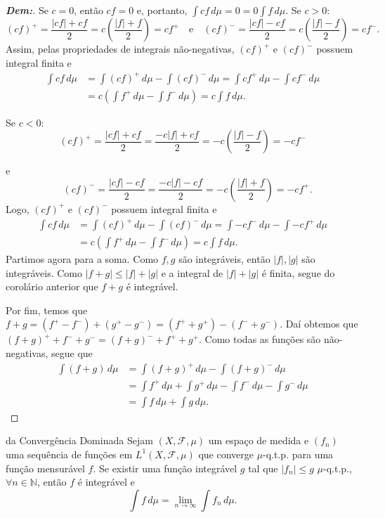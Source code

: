 \begin{proof}[\textbf{Dem:}]
Se $c = 0$, então $cf = 0$ e, portanto, $\int cf \, d\mu = 0 = 0 \int f \, d\mu$.
Se $c > 0$:
$$ (cf)^+ = \frac{|cf| + cf}{2} = c \left( \frac{|f| + f}{2} \right) = c f^+ \quad \text{e} \quad (cf)^- = \frac{|cf| - cf}{2} = c \left( \frac{|f| - f}{2} \right) = c f^-. $$
Assim, pelas propriedades de integrais não-negativas, $(cf)^+$ e $(cf)^-$ possuem integral finita e
\begin{align*}
  \int cf \, d\mu &= \int (cf)^+ \, d\mu - \int (cf)^- \, d\mu 
  = \int c f^+ \, d\mu - \int c f^- \, d\mu \\
  &= c \left( \int f^+ \, d\mu - \int f^- \, d\mu \right) = c \int f \, d\mu. 
\end{align*}

\noindent
Se $c < 0$:
$$ (cf)^+ = \frac{|cf| + cf}{2} = \frac{-c|f| + cf}{2} = -c \left( \frac{|f| - f}{2} \right) = -c f^-$$ 

\noindent
e
  $$\quad (cf)^- = \frac{|cf| - cf}{2} = \frac{-c|f| - cf}{2} = -c \left( \frac{|f| + f}{2} \right) = -c f^+. $$
Logo, $(cf)^+$ e $(cf)^-$ possuem integral finita e
\begin{align*}
  \int cf \, d\mu &= \int (cf)^+ \, d\mu - \int (cf)^- \, d\mu 
  = \int -cf^- \, d\mu - \int -cf^+ \, d\mu\\
  &= c \left( \int f^+ \, d\mu - \int f^- \, d\mu \right) = c \int f \, d\mu.  
\end{align*} 
Partimos agora para a soma. Como $f, g$ são integráveis, então $|f|, |g|$ são integráveis. Como $|f+g| \le |f| + |g|$ e a integral de $|f| + |g|$ é finita, segue do corolário anterior que $f+g$ é integrável.

Por fim, temos que $f+g = (f^+ - f^-) + (g^+ - g^-) = (f^+ + g^+) - (f^- + g^-)$. 
  Daí obtemos que $(f+g)^+ + f^- + g^- = (f+g)^- + f^+ + g^+$.
  Como todas as funções são não-negativas, segue que  
\begin{align*}
  \int (f+g) \, d\mu &=  \int (f+g)^+ \, d\mu - \int (f+g)^- \, d\mu\\
    &= \int f^+ \, d\mu  + \int g^+ \, d\mu - \int f^- \, d\mu - \int g^- \, d\mu \\
     &= \int f \, d\mu + \int g \, d\mu.
\end{align*}
\end{proof}

\begin{theorem*}{ da Convergência Dominada}
Sejam $(X, \mathcal{F}, \mu)$ um espaço de medida e $(f_n)$ uma sequência de funções em $L^1(X, \mathcal{F}, \mu)$ que converge $\mu$-q.t.p. para uma função mensurável $f$. Se existir uma função integrável $g$ tal que $|f_n| \le g$ $\mu$-q.t.p., $\forall n \in \mathbb{N}$, então $f$ é integrável e 
$$ \int f \, d\mu = \lim_{n \to \infty} \int f_n \, d\mu. $$
\end{theorem*}

